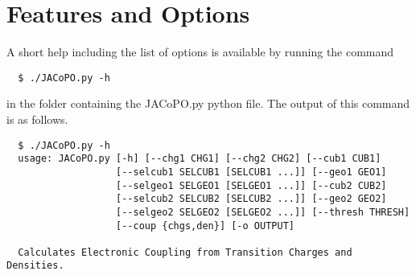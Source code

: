 \documentclass[a4paper]{article}
\begin{document}
\section{Features and Options}
\label{Options}
A short help including the list of options is available by running the command

\begin{verbatim}
  $ ./JACoPO.py -h
\end{verbatim}

in the folder containing the JACoPO.py python file. The output of this command is as follows.

\begin{verbatim}
  $ ./JACoPO.py -h
  usage: JACoPO.py [-h] [--chg1 CHG1] [--chg2 CHG2] [--cub1 CUB1]
                   [--selcub1 SELCUB1 [SELCUB1 ...]] [--geo1 GEO1]
                   [--selgeo1 SELGEO1 [SELGEO1 ...]] [--cub2 CUB2]
                   [--selcub2 SELCUB2 [SELCUB2 ...]] [--geo2 GEO2]
                   [--selgeo2 SELGEO2 [SELGEO2 ...]] [--thresh THRESH]
                   [--coup {chgs,den}] [-o OUTPUT]
  
  Calculates Electronic Coupling from Transition Charges and Densities.
  

\end{verbatim}
\end{document}
